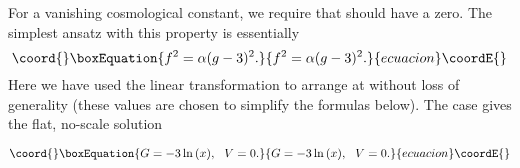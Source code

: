 \documentclass[a4paper,12pt]{article}
\begin{document}
For a vanishing cosmological constant, we require that \coordHE{} should
have a zero. The simplest ansatz with this property is essentially
\begin{equation}\coord{}\boxEquation{\label{A}
f^{2} = \alpha (g-3)^{2}.
}{f^{2} = \alpha (g-3)^{2}.
}{ecuacion}\coordE{}\end{equation}
Here we have used the linear transformation \coordHE{}
to arrange \coordHE{} at \coordHE{} without loss of generality
(these values are chosen to simplify the formulas below). The case
\coordHE{} gives the flat, no-scale solution

\begin{equation}\coord{}\boxEquation{\label{P}
G = -3\ln{(x)},\  \ V=0.
}{G = -3\ln{(x)},\  \ V=0.
}{ecuacion}\coordE{}\end{equation}
\end{document}
